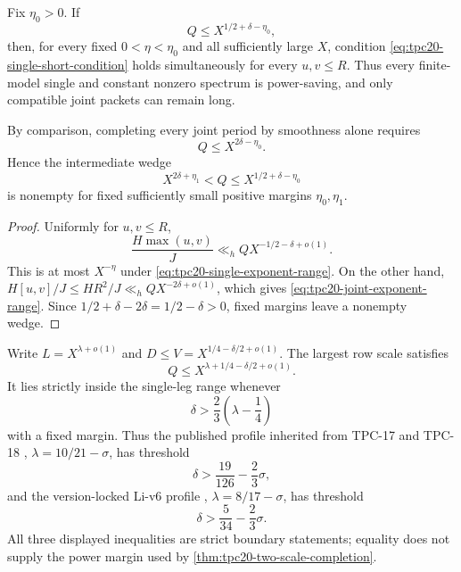 \begin{corollary}
\label{cor:tpc20-whole-single-range}
Fix \(\eta_0>0\).  If
\begin{equation}
 Q\le X^{1/2+\delta-\eta_0},
 \label{eq:tpc20-single-exponent-range}
\end{equation}
then, for every fixed \(0<\eta<\eta_0\) and all sufficiently large
\(X\), condition \eqref{eq:tpc20-single-short-condition} holds
simultaneously for every \(u,v\le R\).  Thus every finite-model single
and constant nonzero spectrum is power-saving, and only compatible joint
packets can remain long.

By comparison, completing every joint period by smoothness alone requires
\begin{equation}
 Q\le X^{2\delta-\eta_0}.
 \label{eq:tpc20-joint-exponent-range}
\end{equation}
Hence the intermediate wedge
\begin{equation}
 X^{2\delta+\eta_1}<Q\le X^{1/2+\delta-\eta_0}
 \label{eq:tpc20-intermediate-wedge}
\end{equation}
is nonempty for fixed sufficiently small positive margins
\(\eta_0,\eta_1\).
\end{corollary}

\begin{proof}
Uniformly for \(u,v\le R\),
\[
 \frac{H\max(u,v)}J
 \ll_h QX^{-1/2-\delta+o(1)}.
\]
This is at most \(X^{-\eta}\) under
\eqref{eq:tpc20-single-exponent-range}.  On the other hand,
\(H[u,v]/J\le HR^2/J\ll_h QX^{-2\delta+o(1)}\), which gives
\eqref{eq:tpc20-joint-exponent-range}.  Since
\(1/2+\delta-2\delta=1/2-\delta>0\), fixed margins leave a nonempty
wedge.
\end{proof}

\begin{corollary}
\label{cor:tpc20-profile-ledger}
Write \(L=X^{\lambda+o(1)}\) and
\(D\le V=X^{1/4-\delta/2+o(1)}\).  The largest row scale satisfies
\begin{equation}
 Q\le X^{\lambda+1/4-\delta/2+o(1)}.
 \label{eq:tpc20-largest-row-exponent}
\end{equation}
It lies strictly inside the single-leg range whenever
\begin{equation}
 \delta>\frac23\left(\lambda-\frac14\right)
 \label{eq:tpc20-profile-threshold}
\end{equation}
with a fixed margin.  Thus the published profile inherited from
TPC-17 and TPC-18 \citep{WangTPC17,WangTPC18},
\(\lambda=10/21-\sigma\), has threshold
\begin{equation}
 \delta>\frac{19}{126}-\frac23\sigma,
 \label{eq:tpc20-published-threshold}
\end{equation}
and the version-locked Li-v6 profile
\citep{Li2026v6,WangTPC17,WangTPC18},
\(\lambda=8/17-\sigma\), has threshold
\begin{equation}
 \delta>\frac5{34}-\frac23\sigma.
 \label{eq:tpc20-li-threshold}
\end{equation}
All three displayed inequalities are strict boundary statements; equality
does not supply the power margin used by
\cref{thm:tpc20-two-scale-completion}.
\end{corollary}

